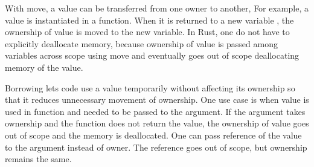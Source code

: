 With move, a value can be transferred from one owner to another, For example, a value is instantiated in a function. 
When it is returned to a new variable , the ownership of value is moved to the new variable. In Rust, one do not have to explicitly deallocate memory, 
because ownership of value is passed among variables across scope using move and eventually goes out of scope deallocating memory of the value.

Borrowing lets code use a value temporarily without affecting its ownership so that it reduces unnecessary movement of ownership. 
One use case is when value is used in function and needed to be passed to the argument. If the argument takes ownership and the function does not return the value, 
the ownership of value goes out of scope and the memory is deallocated. One can pass reference of the value to the argument instead of owner. 
The reference goes out of scope, but ownership remains the same. 


